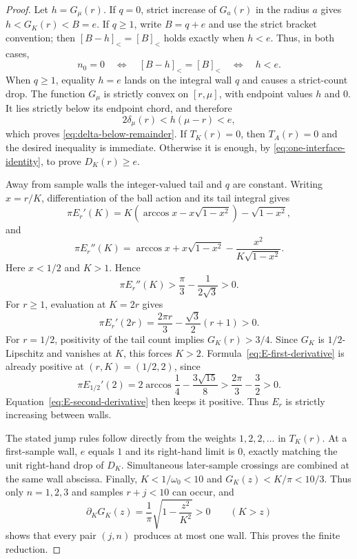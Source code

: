 \documentclass[11pt]{article}
\theoremstyle{remark}
\begin{document}
\begin{proof}
Let $h=G_\mu(r)$.  If $q=0$, strict increase of $G_a(r)$ in the radius
$a$ gives $h<G_K(r)<B=e$.  If $q\geq1$, write $B=q+e$ and use the strict
bracket convention; then $[B-h]_<=[B]_<$ holds exactly when $h<e$.
Thus, in both cases,
\[
 n_0=0
 \quad\Longleftrightarrow\quad
 [B-h]_<=[B]_<
 \quad\Longleftrightarrow\quad
 h<e.
\]
When $q\geq1$, equality $h=e$ lands on the integral wall $q$ and causes a
strict-count drop.  The function $G_\mu$ is strictly convex on
$[r,\mu]$, with endpoint values $h$ and $0$.  It lies strictly below its
endpoint chord, and therefore
\[
 2\delta_\mu(r)<h(\mu-r)<e,
\]
which proves \eqref{eq:delta-below-remainder}.  If $T_K(r)=0$, then
$T_A(r)=0$ and the desired inequality is immediate.  Otherwise it is
enough, by \eqref{eq:one-interface-identity}, to prove
$D_K(r)\geq e$.

Away from sample walls the integer-valued tail and $q$ are constant.
Writing $x=r/K$, differentiation of the ball action and its tail integral
gives
\begin{equation}
 \pi E_r'(K)
 =
 K\left(\arccos x-x\sqrt{1-x^2}\right)-\sqrt{1-x^2},
 \label{eq:E-first-derivative}
\end{equation}
and
\begin{equation}
 \pi E_r''(K)
 =
 \arccos x+x\sqrt{1-x^2}
 -\frac{x^2}{K\sqrt{1-x^2}}.
 \label{eq:E-second-derivative}
\end{equation}
Here $x<1/2$ and $K>1$.  Hence
\[
 \pi E_r''(K)>
 \frac\pi3-\frac1{2\sqrt3}>0.
\]
For $r\geq1$, evaluation at $K=2r$ gives
\[
 \pi E_r'(2r)
 =
 \frac{2\pi r}{3}-\frac{\sqrt3}{2}(r+1)>0.
\]
For $r=1/2$, positivity of the tail count implies
$G_K(r)>3/4$.  Since $G_K$ is $1/2$-Lipschitz and vanishes at $K$, this
forces $K>2$.  Formula~\eqref{eq:E-first-derivative} is already positive
at $(r,K)=(1/2,2)$, since
\[
 \pi E_{1/2}'(2)
 =
 2\arccos\frac14-\frac{3\sqrt{15}}8
 >
 \frac{2\pi}{3}-\frac32>0.
\]
Equation~\eqref{eq:E-second-derivative} then keeps it positive.  Thus $E_r$ is
strictly increasing between walls.

The stated jump rules follow directly from the weights $1,2,2,\ldots$
in $T_K(r)$.  At a first-sample wall, $e$ equals $1$ and its right-hand
limit is $0$, exactly matching the unit right-hand drop of $D_K$.
Simultaneous later-sample crossings are combined at the same wall
abscissa.  Finally, $K<1/\omega_0<10$ and
$G_K(z)<K/\pi<10/3$.  Thus only $n=1,2,3$ and samples $r+j<10$ can occur,
and
\[
 \partial_KG_K(z)=\frac1\pi\sqrt{1-\frac{z^2}{K^2}}>0
 \qquad(K>z)
\]
shows that every pair $(j,n)$ produces at most one wall.  This proves the
finite reduction.
\end{proof}
\end{document}

